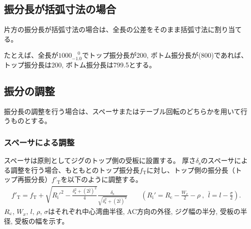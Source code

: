 \subsection{振分長が括弧寸法の場合}
片方の振分長が括弧寸法の場合は、全長の公差をそのまま括弧寸法に割り当てる。
\begin{hosoku}
たとえば、全長が$1000^{\phantom +0}_{-1.0}$でトップ振分長が200, ボトム振分長が(800)であれば、トップ振分長は200, ボトム振分長は799.5とする。
\end{hosoku}


\subsection{振分の調整}
振分長の調整を行う場合は、スペーサまたはテーブル回転のどちらかを用いて行うものとする。

\subsubsection{スペーサによる調整}
スペーサは原則としてジグのトップ側の受板に設置する。
厚さ$\delta_\mathrm s$のスペーサによる調整を行う場合、もともとのトップ振分長$f_\mathrm T$に対し、トップ側の振分長（トップ再振分長）$f'_\mathrm T$を以下のように調整する。
\begin{align*}
  f'_\mathrm T
  = f_\mathrm T
    +\sqrt{R_\mathrm i'^2-\frac{\delta_\mathrm s^2+(2\bar l)^2}4}\frac{\delta_\mathrm s}{\sqrt{\delta_\mathrm s^2+(2\bar l)^2}}\qquad
    \left(R_\mathrm i' = R_\mathrm c-\frac{W_x}2-\rho~,~~\bar l = l-\frac\sigma2\right).
\end{align*}
$R_\textrm c$, $W_x$, $l$, $\rho$, $\sigma$はそれぞれ中心湾曲半径, AC方向の外径, ジグ幅の半分, 受板の半径, 受板の幅を示す。

